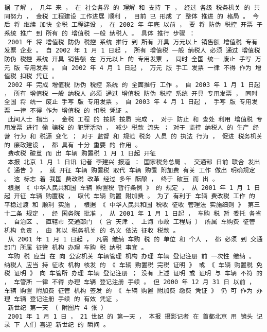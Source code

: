 \documentclass{article}
\begin{document}
\begin{Verbatim}[commandchars=\\\{\}]
 据 了解 ， 几年 来 ， 在 社会各界 的 理解 和 支持 下 ， 经过 各级 税务机关 的 共同努力 ， 金税 工程建设 工作进展 顺利 ， 目前 已 形成 了 整体 推进 的 格局 。 今后 将 继续 加快 金税 工程建设 ， 在 2002 年 年底 以前 ， 要 将 防伪 税控 开票 子系统 推广 到 所有 的 增值税 一般 纳税人 。 具体 推行 步骤 ： 
 2001 年 将 增值税 防伪 税控 系统 推行 到 所有 开具 万元以上 销售额 增值税 专有 发票 企业 。 自 2002 年 1 月 1 日起 ， 所有 增值税 一般 纳税人 必须 通过 增值税 防伪 税控 系统 开具 销售额 在 万元以上 的 专用发票 ， 同时 全国 统一 废止 手写 万元 版 专用发票 。 自 2002 年 4 月 1 日起 ， 万元 版 手工 发票 一律 不得 作为 增值税 扣税 凭证 。 
 2002 年 完成 增值税 防伪 税控 系统 的 全面推行 工作 。 自 2003 年 1 月 1 日起 ， 所有 增值税 一般 纳税人 必须 通过 增值税 防伪 税控 系统 开具 专用发票 ， 同时 全国 将 统一 废止 手写 版 专用发票 。 自 2003 年 4 月 1 日起 ， 手写 版 专用发票 一律 不得 作为 增值税 的 扣税 凭证 。 
 此间人士 指出 ， 金税 工程 的 按期 按质 完成 ， 对于 防止 和 查处 利用 增值税 专用发票 进行 偷 骗税 的 犯罪活动 ， 减少 税款 流失 ； 对于 监控 纳税人 的 生产 经营 行为 和 税源 变化 ； 对于 监督 和 规范 税务 人员 的 执法 行为 ， 促进 税务机关 的 廉政建设 ， 都 具有 十分 重要 的 作用 。 
 费改税 破茧 而 出 车辆 购置税 1 月 1 日起 开征 
 本报 北京 1 月 1 日讯 记者 李建兴 报道 ： 国家税务总局 、 交通部 日前 联合 发出 《 通告 》 ， 就 开征 车辆 购置税 取代 车辆 购置 附加费 有关 工作 做出 明确规定 。 这 标志 着 我国 费改税 改革 经过 多年 酝酿 ， 终于 破茧 而 出 。 
 根据 《 中华人民共和国 车辆 购置税 暂行条例 》 的 规定 ， 从 2001 年 1 月 1 日起 开征 车辆 购置税 ， 取代 车辆 购置 附加费 。 为了 有利于 车辆 费改税 工作 的 平稳过渡 和 顺利 实施 ， 根据 《 中华人民共和国 税收 征收 管理法 实施细则 》 第三十二条 规定 ， 经 国务院 批准 ， 从 2001 年 1 月 1 日起 ， 车购 税 暂 委托 各省 、 自治区 、 直辖市 交通部门 （ 含 天津 、 上海 市政 工程局 ） 所属 车购费 征管 机构 负责 ， 由 其以 税务机关 的 名义 依法 征收 税款 。 
 从 2001 年 1 月 1 日起 ， 凡需 缴纳 车购 税 的 单位 和 个人 ， 都 必须 到 交通部门 所属 征管 机构 办理 车购 税 纳税 事宜 。 
 车购 税 应当 在 向 公安机关 车辆管理 机构 办理 车辆 登记注册 前 一次性 缴纳 。 纳税人 应当 持 征收 机构 核发 的 《 车辆 购置税 完税 证明 》 或 《 车辆 购置税 免税 证明 》 向 车管所 办理 车辆 登记注册 ； 没有 上述 证明 或 证明 与 车辆 不符 的 ， 车管所 一律 不得 办理 车辆 登记注册 手续 。 但 2000 年 12 月 31 日 以前 ， 车辆 购置 附加费 征管 机构 签发 的 《 车辆 购置 附加费 缴费 凭证 》 仍 可 作为 办理 车辆 登记注册 手续 的 有效 凭证 。 
 新世纪 第一天 （ 附图片 4 张 ） 
 2001 年 1 月 1 日 ， 21 世纪 的 第一天 ， 本报 摄影记者 在 首都北京 用 镜头 记录 下 人们 喜迎 新世纪 的 瞬间 。 

\end{Verbatim}
\end{document}
